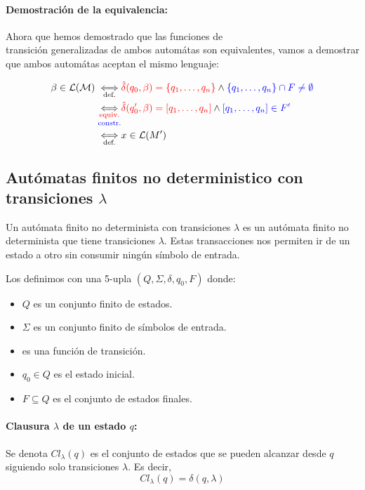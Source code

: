 \paragraph{Demostración de la equivalencia:} Ahora que hemos demostrado que las funciones de \\ transición generalizadas de ambos automátas son equivalentes, vamos a demostrar que ambos automátas aceptan el mismo lenguaje:

\begin{align*}
  \beta \in \mathcal{L}(\mathcal{M})  \iffa{def.} & \red{\hat\delta(q_0, \beta) = \{q_1,\dots, q_n\}}\land\blue{\{q_1,\dots,q_n\}\cap F \neq \emptyset} \\
  \iffab{\red{equiv.}}{\blue{constr.}}            & \red{\hat\delta(q_0', \beta) = [q_1,\dots, q_n]}\land\blue{[q_1,\dots,q_n]\in F'}                   \\
  \iffa{def.}                                     & x\in\mathcal{L}(M')
\end{align*}

\subsection{Autómatas finitos no deterministico con transiciones  \texorpdfstring{\(\lambda\)}{lambda}}
\label{sec:afd-lambda}
Un autómata finito no determinista con transiciones \(\lambda\) es un autómata finito no determinista que tiene transiciones \(\lambda\). Estas transacciones nos permiten ir de un estado a otro sin consumir ningún símbolo de entrada.

Los definimos con una 5-upla \((Q,\Sigma,\delta,q_0,F)\) donde:
\begin{itemize}
  \item \(Q\) es un conjunto finito de estados.
  \item \(\Sigma\) es un conjunto finito de símbolos de entrada.
  \item {} es una función de transición.
  \item \(q_0 \in Q\) es el estado inicial.
  \item \(F \subseteq Q\) es el conjunto de estados finales.
\end{itemize}

\paragraph{Clausura \(\lambda\) de un estado \(q\):} Se denota \(Cl_\lambda(q)\) es el conjunto de estados que se pueden alcanzar desde \(q\) siguiendo solo transiciones \(\lambda\). Es decir, \[Cl_\lambda(q) = \delta(q,\lambda)\]

